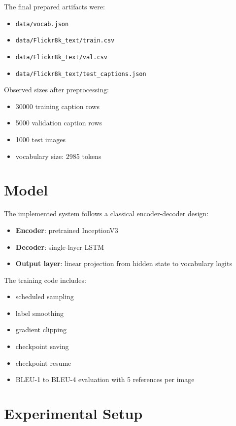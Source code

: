 \documentclass[11pt,a4paper]{article}
\begin{document}
The final prepared artifacts were:
\begin{itemize}[leftmargin=*]
    \item \texttt{data/vocab.json}
    \item \texttt{data/Flickr8k\_text/train.csv}
    \item \texttt{data/Flickr8k\_text/val.csv}
    \item \texttt{data/Flickr8k\_text/test\_captions.json}
\end{itemize}

Observed sizes after preprocessing:
\begin{itemize}[leftmargin=*]
    \item 30000 training caption rows
    \item 5000 validation caption rows
    \item 1000 test images
    \item vocabulary size: 2985 tokens
\end{itemize}

\section{Model}

The implemented system follows a classical encoder-decoder design:
\begin{itemize}[leftmargin=*]
    \item \textbf{Encoder}: pretrained InceptionV3
    \item \textbf{Decoder}: single-layer LSTM
    \item \textbf{Output layer}: linear projection from hidden state to vocabulary logits
\end{itemize}

The training code includes:
\begin{itemize}[leftmargin=*]
    \item scheduled sampling
    \item label smoothing
    \item gradient clipping
    \item checkpoint saving
    \item checkpoint resume
    \item BLEU-1 to BLEU-4 evaluation with 5 references per image
\end{itemize}

\section{Experimental Setup}
\end{document}
